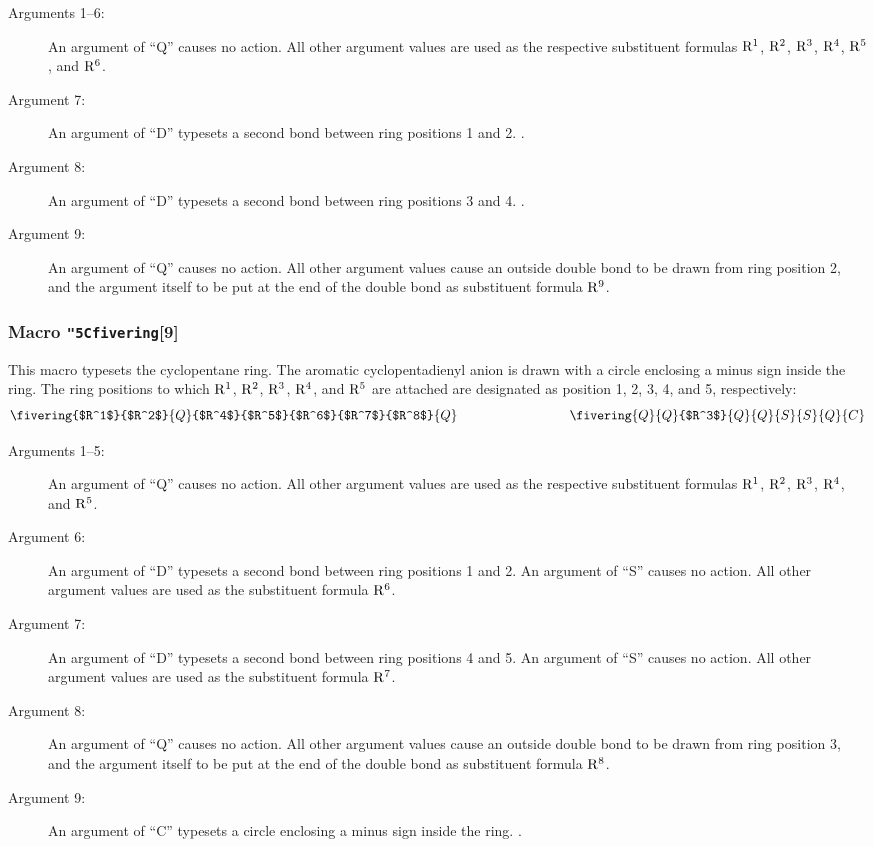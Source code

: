  \begin{description}
 \item[{\rm Arguments 1--6:}] An argument of ``Q'' causes
      no action. All other argument values are used as the respective
      substituent formulas ${\rm R^1}$, ${\rm R^2}$, ${\rm R^3}$,
      ${\rm R^4}$, ${\rm R^5}$, and ${\rm R^6}$.
 \item[{\rm Argument 7:}] An argument of ``D'' typesets
      a second bond between ring positions 1 and 2. \ru .
 \item[{\rm Argument 8:}] An argument of ``D'' typesets
      a second bond between ring positions 3 and 4. \ru .
 \item[{\rm Argument 9:}] An argument of ``Q'' causes
      no action. All other argument values cause an outside
      double bond to be drawn from ring position 2, and the
      argument itself to be put at the end of the double bond
      as substituent formula ${\rm R^9}$.
 \end{description}
 
\subsubsection{Macro {\tt\char"5C{}fivering}[9]}
  This macro typesets the cyclopentane ring. The aromatic
 cyclopentadienyl anion is drawn with a circle enclosing a
 minus sign inside the ring. The ring positions to which
 ${\rm R^1}$, ${\rm R^2}$, ${\rm R^3}$, ${\rm R^4}$, and
 ${\rm R^5}$ are attached are designated as position
 1, 2, 3, 4, and 5, respectively:
 \[ \fivering{$R^1$}{$R^2$}{Q}{$R^4$}{$R^5$}{$R^6$}{$R^7$}{$R^8$}{Q}
    \hspace{3cm}
    \fivering{Q}{Q}{$R^3$}{Q}{Q}{S}{S}{Q}{C}  \]
 
 \begin{description}
 \item[{\rm Arguments 1--5:}] An argument of ``Q''
      causes no action. All other argument values are used as the
      respective substituent formulas ${\rm R^1}$, ${\rm R^2}$,
      ${\rm R^3}$, ${\rm R^4}$, and ${\rm R^5}$.
 \item[{\rm Argument 6:}] An argument of ``D'' typesets
      a second bond between ring positions 1 and 2. An argument
      of ``S'' causes no action. All other argument values are
      used as the substituent formula ${\rm R^6}$.
 \item[{\rm Argument 7:}] An argument of ``D'' typesets
      a second bond between ring positions 4 and 5. An argument
      of ``S'' causes no action.  All other argument values are
      used as the substituent formula ${\rm R^7}$.
 \item[{\rm Argument 8:}] An argument of ``Q'' causes
      no action. All other argument values cause an outside
      double bond to be drawn from ring position 3, and the
      argument itself to be put at the end of the double bond
      as substituent formula ${\rm R^8}$.
 \item[{\rm Argument 9:}] An argument of ``C'' typesets
      a circle enclosing a minus sign inside the ring. \ru .
 \end{description}
 
